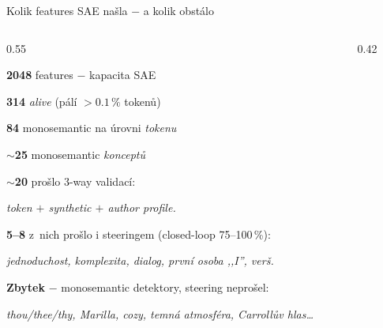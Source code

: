\documentclass[aspectratio=169,10pt]{beamer}
\begin{document}
\begin{frame}[t]{Kolik features SAE našla $-$ a kolik obstálo}
  \vspace{2mm}
  \begin{columns}[T,onlytextwidth]
    \begin{column}{0.55\textwidth}
      \vspace{2mm}
      {\small
      \textbf{2048} features $-$ kapacita SAE\par\vspace{0.8mm}
      \textbf{314} \emph{alive} (pálí $>0.1\,\%$ tokenů)\par\vspace{0.8mm}
      \textbf{84} monosemantic na úrovni \emph{tokenu}\\ \par\vspace{0.8mm}
      \textbf{$\sim$25} monosemantic \emph{konceptů}\\ \par\vspace{3mm}
      }
      {\small\color{accGreen}\textbf{$\sim$20} prošlo 3-way validací:}\par\vspace{0.5mm}
      {\footnotesize\color{bodyText}\itshape token $+$ synthetic $+$ author profile.}\par\vspace{2mm}
      {\small\color{accBlue}\textbf{5--8} z~nich prošlo i steeringem (closed-loop 75--100\,\%):}\par\vspace{0.5mm}
      {\footnotesize\color{bodyText}\itshape jednoduchost, komplexita, dialog, první osoba ,,I'', verš.}\par\vspace{2mm}
      {\small\color{accOrange}\textbf{Zbytek} $-$ monosemantic detektory, steering neprošel:}\par\vspace{0.5mm}
      {\footnotesize\color{bodyText}\itshape thou/thee/thy, Marilla, cozy, temná atmosféra, Carrollův hlas\ldots}
    \end{column}
    \begin{column}{0.42\textwidth}
      \vspace{2mm}

\end{column}
\end{columns}
\end{frame}
\end{document}
